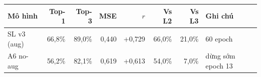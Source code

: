 \begin{center}\scriptsize\setlength{\tabcolsep}{2pt}
\begin{tabular}{@{}lrrrrrrl@{}}
\toprule
Mô hình & Top-1 & Top-3 & MSE & $r$ & Vs L2 & Vs L3 & Ghi chú \\
\midrule
SL v3 (aug) & 66,8\% & 89,0\% & 0,440 & +0,729 & 66,0\% & 21,0\% & 60 epoch \\
A6 no-aug & 56,2\% & 82,1\% & 0,619 & +0,613 & 54,0\% & 7,0\% & dừng sớm epoch 13 \\
\bottomrule
\end{tabular}
\end{center}